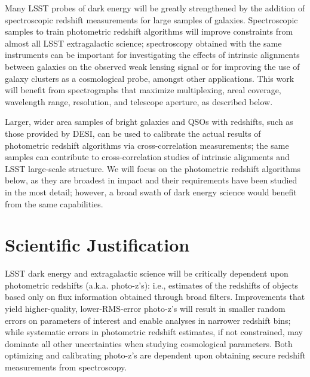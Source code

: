 
\label{sec:photoz}

Many LSST probes of dark energy will be greatly strengthened by the addition of spectroscopic redshift measurements for large samples of galaxies.  Spectroscopic samples to train photometric redshift algorithms will improve constraints from almost all LSST extragalactic science; spectroscopy obtained with the same instruments can be important for investigating the effects of intrinsic alignments between galaxies on the observed weak lensing signal or for improving the use of galaxy clusters as a cosmological probe, amongst other applications.  This work will benefit from spectrographs that maximize multiplexing, areal coverage, wavelength range, resolution, and telescope aperture, as described below.

Larger, wider area samples of bright galaxies and QSOs with redshifts, such as those provided by DESI, can be used to calibrate the actual results of photometric redshift algorithms via cross-correlation measurements; the same samples can contribute to cross-correlation studies of intrinsic alignments and LSST large-scale structure.  We will focus on the photometric redshift algorithms below, as they are broadest in impact and their requirements have been studied in the most detail; however, a broad swath of dark energy science would benefit from the same capabilities.

\section{Scientific Justification}

LSST dark energy and extragalactic science will be critically dependent upon photometric redshifts (a.k.a. photo-z's): i.e., estimates of the redshifts of objects based only on flux information obtained through broad filters.  Improvements that yield higher-quality, lower-RMS-error photo-z's will result in smaller random errors on parameters of interest and enable analyses in narrower redshift bins; while systematic errors in photometric redshift estimates, if not constrained, may dominate all other uncertainties when studying cosmological parameters.  Both optimizing and calibrating photo-z's are dependent upon obtaining secure redshift measurements from spectroscopy.

